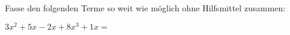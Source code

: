 
Fasse den folgenden Terme so weit wie möglich ohne Hilfsmittel zusammen:

$3x^{2}+5x-2x+8x^{3}+1x=$